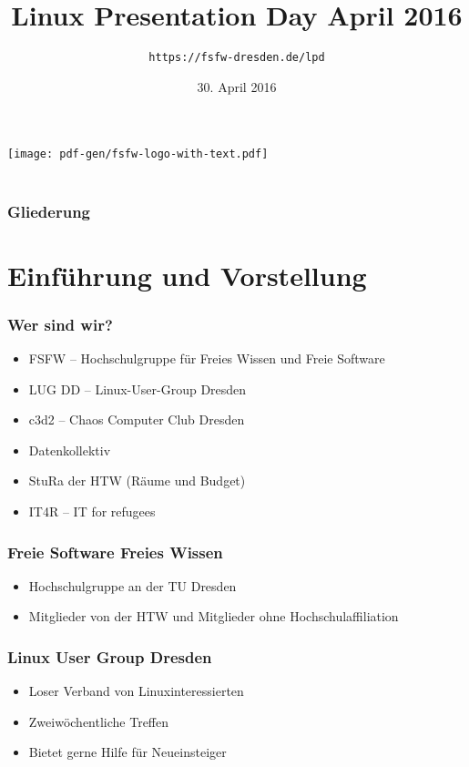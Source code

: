 \documentclass[t]{beamer}
\title{Linux Presentation Day April 2016}
\author{\texttt{https://fsfw-dresden.de/lpd}}
\date[30.04.2016]{30. April 2016}
\begin{document}
\begin{frame}
  \begin{center}%
\texttt{[image: pdf-gen/fsfw-logo-with-text.pdf]}\\%
\vspace*{-1em}{Freie Software Freies Wissen}\\[1em]
  \end{center}
\end{frame}

\begin{frame}
  \frametitle{Gliederung}
  \tableofcontents
\end{frame}

\section{Einführung und Vorstellung}
\begin{frame}
  \frametitle{Wer sind wir?}
  \begin{itemize}
  \item FSFW – Hochschulgruppe für Freies Wissen und Freie Software
  \item LUG DD – Linux-User-Group Dresden
  \item c3d2 – Chaos Computer Club Dresden
  \item Datenkollektiv
  \item StuRa der HTW (Räume und Budget)
  \item IT4R – IT for refugees
  \end{itemize}
\end{frame}

\begin{frame}
  \frametitle{Freie Software Freies Wissen}
  \begin{itemize}
  \item Hochschulgruppe an der TU Dresden
  \item Mitglieder von der HTW und Mitglieder ohne Hochschulaffiliation
  \end{itemize}
\end{frame}

\begin{frame}
  \frametitle{Linux User Group Dresden}
  \begin{itemize}
  \item Loser Verband von Linuxinteressierten
  \item Zweiwöchentliche Treffen
  \item Bietet gerne Hilfe für Neueinsteiger
  \end{itemize}
\end{frame}
\end{document}
